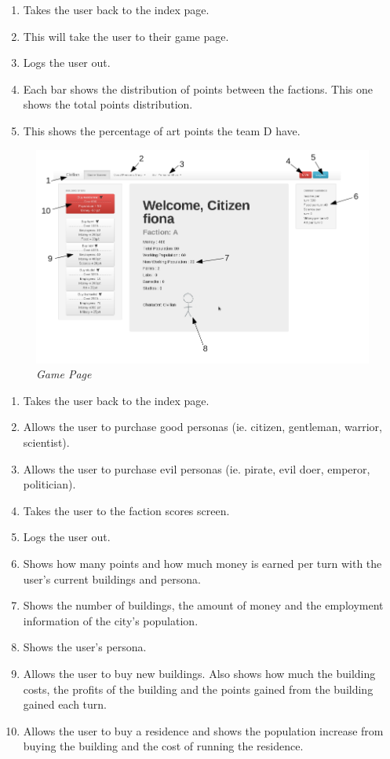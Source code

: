 \documentclass{sig-alt-release2}
\begin{document}
\begin{enumerate}
\item Takes the user back to the index page. 
\item This will take the user to their game page.
\item Logs the user out.
\item Each bar shows the distribution of points between the factions. This one shows the total points distribution.
\item This shows the percentage of art points the team D have.
\end{enumerate}

\begin{figure}[!htbp]
  \caption{\textit{Game Page}}
  \begin{center}
		\includegraphics[scale=0.30]{img/gamelabel.png}
  \end{center}
\end{figure}

\begin{enumerate}
\item Takes the user back to the index page.
\item Allows the user to purchase good personas (ie. citizen, gentleman, warrior, scientist).
\item Allows the user to purchase evil personas (ie. pirate, evil doer, emperor, politician).
\item Takes the user to the faction scores screen.
\item Logs the user out.
\item Shows how many points and how much money is earned per turn with the user's current buildings and persona.
\item Shows the number of buildings, the amount of money and the employment information of the city's population.
\item Shows the user's persona.
\item Allows the user to buy new buildings. Also shows how much the building costs, the profits of the building and the points gained from the building gained each turn.
\item Allows the user to buy a residence and shows the population increase from buying the building and the cost of running the residence.
\end{enumerate}
\end{document}
